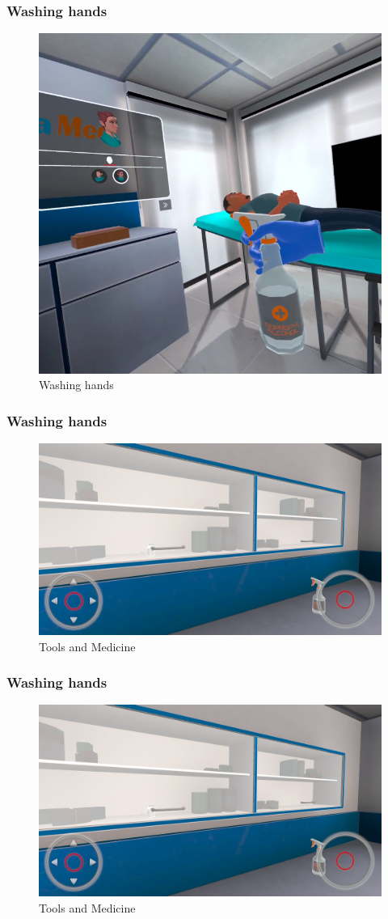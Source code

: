 \subsubsection{Washing hands}
\begin{figure}[h]
	\centering
	\includegraphics[width=0.65\linewidth]{Images/Washing hands.png}
	\caption{Washing hands}
	\label{fig:Washing-hands}
\end{figure}

\subsubsection{Washing hands}
\begin{figure}[h]
	\centering
	\includegraphics[width=0.65\linewidth]{Images/Tools and Medicine.png}
	\caption{Tools and Medicine}
	\label{fig:system-diagram}
\end{figure}

\subsubsection{Washing hands}
\begin{figure}[h]
	\centering
	\includegraphics[width=0.65\linewidth]{Images/Tools and Medicine.png}
	\caption{Tools and Medicine}
	\label{fig:system-diagram}
\end{figure}

